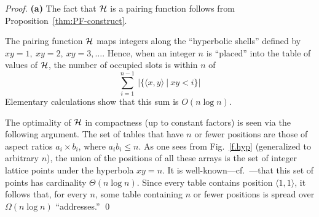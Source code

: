 \begin{proof}
{\bf (a)} The fact that $\mbox{$\cal H$}$ is a pairing function follows from Proposition~\ref{thm:PF-construct}.

\smallskip

The pairing function $\mbox{$\cal H$}$ maps integers along the ``hyperbolic shells'' defined by $xy = 1, \ xy =2, \ xy=3, \ldots$.  Hence, when an integer $n$ is ``placed'' into the table of values of $\mbox{$\cal H$}$, the number of occupied slots is within $n$ of
\[ \sum_{i=1}^{n-1} \ |\{ \langle x,y \rangle \ | \ xy < i \}|  \]
Elementary calculations show that this sum is $O(n \log n)$.

\smallskip

The optimality of $\mbox{$\cal H$}$ in compactness (up to constant factors) is seen via the following argument.  The set of tables that have $n$ or fewer positions are those of aspect ratios $a_i \times b_i$, where $a_i b_i \leq n$.  As one sees from Fig.~\ref{f.hyp} (generalized to arbitrary $n$), the union of the positions of all these arrays is the set of integer lattice points under the hyperbola $xy = n$.  It is well-known---cf.~\cite{NivenZ80}---that this set of points has cardinality $\Theta(n \log n)$.  Since every table contains position $\langle 1,1 \rangle$, it follows that, for every $n$, some table containing $n$ or fewer positions is spread over $\Omega(n \log n)$ ``addresses.''  \qed
\end{proof}
